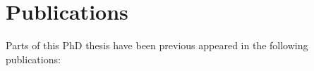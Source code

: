 \chapter*{Publications}
Parts of this PhD thesis have been previous appeared in the following publications:

\begin{refsection}[ownpubs]
    \small
    \nocite{*} %
    \printbibliography[heading=none]
\end{refsection}